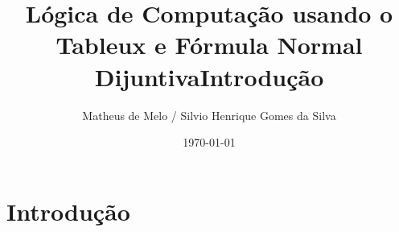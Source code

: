 \documentclass{article}
\title{Lógica de Computação usando o Tableux e Fórmula Normal Dijuntiva}
\author{Matheus de Melo / Silvio Henrique Gomes da Silva }
\date{\today}
\begin{document}
	\maketitle
\section{Introdução}	
\title{Introdução}
\end{document}
